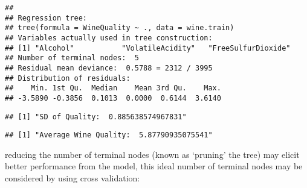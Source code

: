 \documentclass[12pt]{article}
\newenvironment{Shaded}{\begin{snugshade}}{\end{snugshade}}
\newcommand{\KeywordTok}[1]{\textcolor[rgb]{0.13,0.29,0.53}{\textbf{#1}}}
\newcommand{\NormalTok}[1]{#1}
\newcommand{\OperatorTok}[1]{\textcolor[rgb]{0.81,0.36,0.00}{\textbf{#1}}}
\newcommand{\StringTok}[1]{\textcolor[rgb]{0.31,0.60,0.02}{#1}}
\begin{document}
\begin{verbatim}
## 
## Regression tree:
## tree(formula = WineQuality ~ ., data = wine.train)
## Variables actually used in tree construction:
## [1] "Alcohol"           "VolatileAcidity"   "FreeSulfurDioxide"
## Number of terminal nodes:  5 
## Residual mean deviance:  0.5788 = 2312 / 3995 
## Distribution of residuals:
##    Min. 1st Qu.  Median    Mean 3rd Qu.    Max. 
## -3.5890 -0.3856  0.1013  0.0000  0.6144  3.6140
\end{verbatim}

\begin{Shaded}
\end{Shaded}

\begin{verbatim}
## [1] "SD of Quality:  0.885638574967831"
\end{verbatim}

\begin{Shaded}
\end{Shaded}

\begin{verbatim}
## [1] "Average Wine Quality:  5.87790935075541"
\end{verbatim}

reducing the number of terminal nodes (known as `pruning' the tree) may
elicit better performance from the model, this ideal number of terminal
nodes may be considered by using cross validation:
\end{document}
